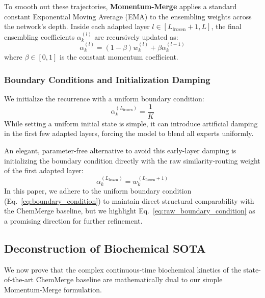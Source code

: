 To smooth out these trajectories, \textbf{Momentum-Merge} applies a standard constant Exponential Moving Average (EMA) to the ensembling weights across the network's depth. Inside each adapted layer $l \in [L_{\text{frozen}}+1, L]$, the final ensembling coefficients $\alpha_k^{(l)}$ are recursively updated as:
\begin{equation}
    \alpha_k^{(l)} = (1 - \beta) w_k^{(l)} + \beta \alpha_k^{(l-1)}
    \label{eq:momentum_merge}
\end{equation}
where $\beta \in [0, 1]$ is the constant momentum coefficient.

\subsubsection{Boundary Conditions and Initialization Damping}
We initialize the recurrence with a uniform boundary condition:
\begin{equation}
    \alpha_k^{(L_{\text{frozen}})} = \frac{1}{K}
    \label{eq:boundary_condition}
\end{equation}
While setting a uniform initial state is simple, it can introduce artificial damping in the first few adapted layers, forcing the model to blend all experts uniformly. 

An elegant, parameter-free alternative to avoid this early-layer damping is initializing the boundary condition directly with the raw similarity-routing weight of the first adapted layer:
\begin{equation}
    \alpha_k^{(L_{\text{frozen}})} = w_k^{(L_{\text{frozen}}+1)}
    \label{eq:raw_boundary_condition}
\end{equation}
In this paper, we adhere to the uniform boundary condition (Eq.~\ref{eq:boundary_condition}) to maintain direct structural comparability with the ChemMerge baseline, but we highlight Eq.~\ref{eq:raw_boundary_condition} as a promising direction for further refinement.

\subsection{Deconstruction of Biochemical SOTA}
We now prove that the complex continuous-time biochemical kinetics of the state-of-the-art ChemMerge \cite{chemmerge} baseline are mathematically dual to our simple Momentum-Merge formulation.

